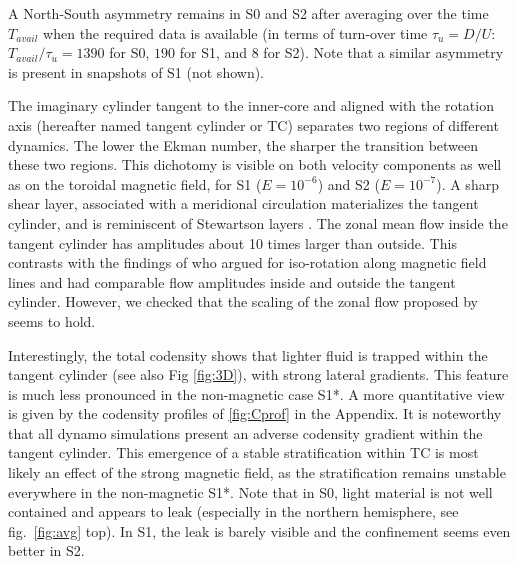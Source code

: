 \documentclass[12pt, a4paper]{article}
\begin{document}
A North-South asymmetry remains in S0 and S2 after averaging over the time $T_{avail}$ when the required data is available (in terms of turn-over time $\tau_u = D/U$: $T_{avail}/\tau_u = 1390$ for S0, $190$ for S1, and $8$ for S2).
Note that a similar asymmetry is present in snapshots of S1 (not shown).

The imaginary cylinder tangent to the inner-core and aligned with the rotation axis (hereafter named tangent cylinder or TC) separates two regions of different dynamics.
The lower the Ekman number, the sharper the transition between these two regions.
This dichotomy is visible on both velocity components as well as on the toroidal magnetic field, for S1 ($E=10^{-6}$) and S2 ($E=10^{-7}$).
A sharp shear layer, associated with a meridional circulation materializes the tangent cylinder, and is reminiscent of Stewartson layers \citep{stewartson1966}.
The zonal mean flow inside the tangent cylinder has amplitudes about 10 times larger than outside.
This contrasts with the findings of \citet{aubert2005} who argued for iso-rotation along magnetic field lines and had comparable flow amplitudes inside and outside the tangent cylinder.
However, we checked that the scaling of the zonal flow proposed by \citet{aubert2005} seems to hold.


Interestingly, the total codensity shows that lighter fluid is trapped within the tangent cylinder (see also Fig \ref{fig:3D}), with strong lateral gradients.
This feature is much less pronounced in the non-magnetic case S1*. %
A more quantitative view is given by the codensity profiles of \ref{fig:Cprof} in the Appendix.
It is noteworthy that all dynamo simulations present an adverse codensity gradient within the tangent cylinder.
This emergence of a stable stratification within TC is most likely an effect of the strong magnetic field, as the stratification remains unstable everywhere in the non-magnetic S1*.
Note that in S0, light material is not well contained and appears to leak (especially in the northern hemisphere, see fig.~\ref{fig:avg} top).
In S1, the leak is barely visible and the confinement seems even better in S2.
\end{document}
